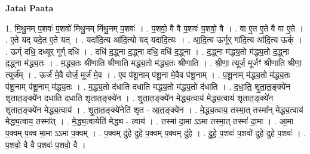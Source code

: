 \documentclass[17pt]{extarticle}
\begin{document}
\textbf{Jatai Paata} \newline

1. मि॒थु॒नम् प॒शवः॑ प॒शवो॑ मिथु॒नम् मि॑थु॒नम् प॒शवः॑ । . प॒शवो॒ वै वै प॒शवः॑ प॒शवो॒ वै । . वा ए॒त ए॒ते वै वा ए॒ते । . ए॒ते यद् यदे॒त ए॒ते यत् । . यदा॑दि॒त्य आ॑दि॒त्यो यद् यदा॑दि॒त्यः । . आ॒दि॒त्य ऊर्गूर् गा॑दि॒त्य आ॑दि॒त्य ऊर्क् । . ऊर्ग् दधि॒ दध्यूर् गूर्ग् दधि॑ । . दधि॑ द॒द्ध्ना द॒द्ध्ना दधि॒ दधि॑ द॒द्ध्ना । . द॒द्ध्ना म॑द्ध्य॒तो म॑द्ध्य॒तो द॒द्ध्ना द॒द्ध्ना म॑द्ध्य॒तः । . म॒द्ध्य॒तः श्री॑णाति श्रीणाति मद्ध्य॒तो म॑द्ध्य॒तः श्री॑णाति । . श्री॒णा॒ त्यूर्ज॒ मूर्जꣳ॑ श्रीणाति श्रीणा॒ त्यूर्ज᳚म् । . ऊर्ज॑ मे॒वै वोर्ज॒ मूर्ज॑ मे॒व । . ए॒व प॑शू॒नाम् प॑शू॒ना मे॒वैव प॑शू॒नाम् । . प॒शू॒नाम् म॑द्ध्य॒तो म॑द्ध्य॒तः प॑शू॒नाम् प॑शू॒नाम् म॑द्ध्य॒तः । . म॒द्ध्य॒तो द॑धाति दधाति मद्ध्य॒तो म॑द्ध्य॒तो द॑धाति । . द॒धा॒ति॒ शृ॒ता॒त॒ङ्क्ये॑न शृतात॒ङ्क्ये॑न दधाति दधाति शृतात॒ङ्क्ये॑न । . शृ॒ता॒त॒ङ्क्ये॑न मेद्ध्य॒त्वाय॑ मेद्ध्य॒त्वाय॑ शृतात॒ङ्क्ये॑न शृतात॒ङ्क्ये॑न मेद्ध्य॒त्वाय॑ । . शृ॒ता॒त॒ङ्क्ये॑नेति॑ शृत - आ॒त॒ङ्क्ये॑न । . मे॒द्ध्य॒त्वाय॒ तस्मा॒त् तस्मा᳚न् मेद्ध्य॒त्वाय॑ मेद्ध्य॒त्वाय॒ तस्मा᳚त् । . मे॒द्ध्य॒त्वायेति॑ मेद्ध्य - त्वाय॑ । . तस्मा॑ दा॒मा ऽऽमा तस्मा॒त् तस्मा॑ दा॒मा । . आ॒मा प॒क्वम् प॒क्व मा॒मा ऽऽमा प॒क्वम् । . प॒क्वम् दु॑हे दुहे प॒क्वम् प॒क्वम् दु॑हे । . दु॒हे॒ प॒शवः॑ प॒शवो॑ दुहे दुहे प॒शवः॑ । . प॒शवो॒ वै वै प॒शवः॑ प॒शवो॒ वै । \newline
\end{document}
